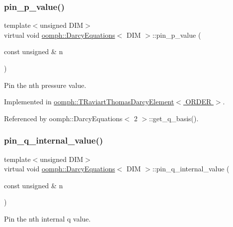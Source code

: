 \subsubsection{\texorpdfstring{pin\+\_\+p\+\_\+value()}{pin\_p\_value()}}
{\footnotesize\ttfamily template$<$unsigned D\+IM$>$ \\
virtual void \hyperlink{classoomph_1_1DarcyEquations}{oomph\+::\+Darcy\+Equations}$<$ D\+IM $>$\+::pin\+\_\+p\+\_\+value (\begin{DoxyParamCaption}\item[{const unsigned \&}]{n }\end{DoxyParamCaption})\hspace{0.3cm}{\ttfamily [pure virtual]}}



Pin the nth pressure value. 



Implemented in \hyperlink{classoomph_1_1TRaviartThomasDarcyElement_ae7a875ecb7a63af9ab75051d9f5b1839}{oomph\+::\+T\+Raviart\+Thomas\+Darcy\+Element$<$ O\+R\+D\+E\+R $>$}.



Referenced by oomph\+::\+Darcy\+Equations$<$ 2 $>$\+::get\+\_\+q\+\_\+basis().

\mbox{\label{classoomph_1_1DarcyEquations_a7731ceb6bd31bfd6cc6c8fa1ee369779}} 
\subsubsection{\texorpdfstring{pin\+\_\+q\+\_\+internal\+\_\+value()}{pin\_q\_internal\_value()}}
{\footnotesize\ttfamily template$<$unsigned D\+IM$>$ \\
virtual void \hyperlink{classoomph_1_1DarcyEquations}{oomph\+::\+Darcy\+Equations}$<$ D\+IM $>$\+::pin\+\_\+q\+\_\+internal\+\_\+value (\begin{DoxyParamCaption}\item[{const unsigned \&}]{n }\end{DoxyParamCaption})\hspace{0.3cm}{\ttfamily [pure virtual]}}



Pin the nth internal q value. 



